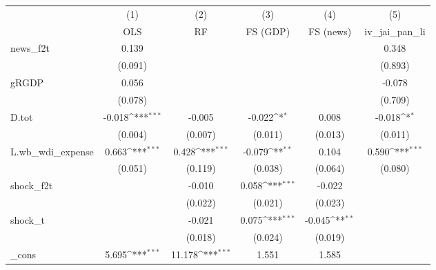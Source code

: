{
\def\sym#1{\ifmmode^{#1}\else\(^{#1}\)\fi}
\begin{tabular}{l*{5}{c}}
\toprule
            &\multicolumn{1}{c}{(1)}&\multicolumn{1}{c}{(2)}&\multicolumn{1}{c}{(3)}&\multicolumn{1}{c}{(4)}&\multicolumn{1}{c}{(5)}\\
            &\multicolumn{1}{c}{OLS}&\multicolumn{1}{c}{RF}&\multicolumn{1}{c}{FS (GDP)}&\multicolumn{1}{c}{FS (news)}&\multicolumn{1}{c}{iv\_jai\_pan\_li}\\
\midrule
news\_f2t    &       0.139         &                     &                     &                     &       0.348         \\
            &     (0.091)         &                     &                     &                     &     (0.893)         \\
\addlinespace
gRGDP       &       0.056         &                     &                     &                     &      -0.078         \\
            &     (0.078)         &                     &                     &                     &     (0.709)         \\
\addlinespace
D.tot       &      -0.018\sym{***}&      -0.005         &      -0.022\sym{*}  &       0.008         &      -0.018\sym{*}  \\
            &     (0.004)         &     (0.007)         &     (0.011)         &     (0.013)         &     (0.011)         \\
\addlinespace
L.wb\_wdi\_expense&       0.663\sym{***}&       0.428\sym{***}&      -0.079\sym{**} &       0.104         &       0.590\sym{***}\\
            &     (0.051)         &     (0.119)         &     (0.038)         &     (0.064)         &     (0.080)         \\
\addlinespace
shock\_f2t   &                     &      -0.010         &       0.058\sym{***}&      -0.022         &                     \\
            &                     &     (0.022)         &     (0.021)         &     (0.023)         &                     \\
\addlinespace
shock\_t     &                     &      -0.021         &       0.075\sym{***}&      -0.045\sym{**} &                     \\
            &                     &     (0.018)         &     (0.024)         &     (0.019)         &                     \\
\addlinespace
\_cons      &       5.695\sym{***}&      11.178\sym{***}&       1.551         &       1.585         &                     \\

\end{tabular}}
